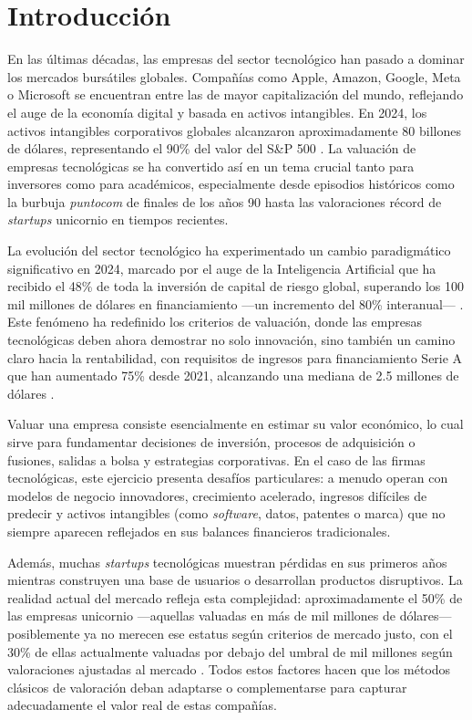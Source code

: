 \chapter{Introducción}

En las últimas décadas, las empresas del sector tecnológico han pasado a dominar los mercados bursátiles globales. Compañías como Apple, Amazon, Google, Meta o Microsoft se encuentran entre las de mayor capitalización del mundo, reflejando el auge de la economía digital y basada en activos intangibles. En 2024, los activos intangibles corporativos globales alcanzaron aproximadamente 80 billones de dólares, representando el 90\% del valor del S\&P 500 \citep{wipo2025,oceantomo2024}. La valuación de empresas tecnológicas se ha convertido así en un tema crucial tanto para inversores como para académicos, especialmente desde episodios históricos como la burbuja \emph{puntocom} de finales de los años 90 hasta las valoraciones récord de \emph{startups} unicornio en tiempos recientes.

La evolución del sector tecnológico ha experimentado un cambio paradigmático significativo en 2024, marcado por el auge de la Inteligencia Artificial que ha recibido el 48\% de toda la inversión de capital de riesgo global, superando los 100 mil millones de dólares en financiamiento ---un incremento del 80\% interanual--- \citep{pitchbook2024}. Este fenómeno ha redefinido los criterios de valuación, donde las empresas tecnológicas deben ahora demostrar no solo innovación, sino también un camino claro hacia la rentabilidad, con requisitos de ingresos para financiamiento Serie A que han aumentado 75\% desde 2021, alcanzando una mediana de 2.5 millones de dólares \citep{carta2024}.

Valuar una empresa consiste esencialmente en estimar su valor económico, lo cual sirve para fundamentar decisiones de inversión, procesos de adquisición o fusiones, salidas a bolsa y estrategias corporativas. En el caso de las firmas tecnológicas, este ejercicio presenta desafíos particulares: a menudo operan con modelos de negocio innovadores, crecimiento acelerado, ingresos difíciles de predecir y activos intangibles (como \emph{software}, datos, patentes o marca) que no siempre aparecen reflejados en sus balances financieros tradicionales.

Además, muchas \emph{startups} tecnológicas muestran pérdidas en sus primeros años mientras construyen una base de usuarios o desarrollan productos disruptivos. La realidad actual del mercado refleja esta complejidad: aproximadamente el 50\% de las empresas unicornio ---aquellas valuadas en más de mil millones de dólares--- posiblemente ya no merecen ese estatus según criterios de mercado justo, con el 30\% de ellas actualmente valuadas por debajo del umbral de mil millones según valoraciones ajustadas al mercado \citep{silicon2024}. Todos estos factores hacen que los métodos clásicos de valoración deban adaptarse o complementarse para capturar adecuadamente el valor real de estas compañías.

